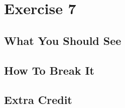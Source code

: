 \chapter{Exercise 7}


\section{What You Should See}


\section{How To Break It}


\section{Extra Credit}



